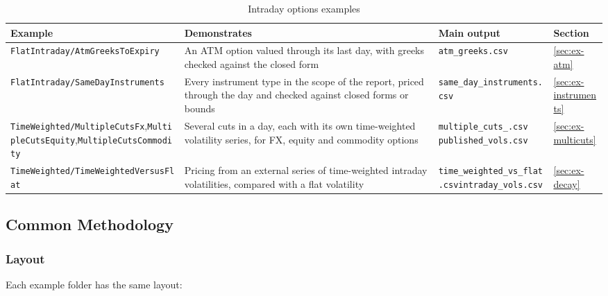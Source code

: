\documentclass[12pt, a4paper]{article}
\begin{document}
\begin{table}[H]
\centering
\small
\begin{tabular}{|>{\raggedright\arraybackslash}p{4.3cm}|>{\raggedright\arraybackslash}p{4.3cm}|>{\raggedright\arraybackslash}p{3.6cm}|l|}
\hline
Example & Demonstrates & Main output & Section \\
\hline
\texttt{FlatIntraday/\allowbreak AtmGreeksToExpiry} & An ATM option valued through its last day, with greeks checked against the
closed form & \texttt{atm\_greeks.csv} & \ref{sec:ex-atm} \\
\hline
\texttt{FlatIntraday/\allowbreak SameDayInstruments} & Every instrument type in the scope of the report, priced
through the day and checked against closed forms or bounds & \texttt{same\_day\_\allowbreak instruments.csv} & \ref{sec:ex-instruments} \\
\hline
\texttt{TimeWeighted/}\newline\texttt{MultipleCutsFx},\newline\texttt{MultipleCutsEquity},\newline\texttt{MultipleCutsCommodity} & Several cuts in a day, each with its own time-weighted
volatility series, for FX, equity and commodity options & \texttt{multiple\_cuts\_\allowbreak *.csv}\newline
\texttt{published\_vols.csv} & \ref{sec:ex-multicuts} \\
\hline
\texttt{TimeWeighted/}\newline\texttt{TimeWeighted\allowbreak VersusFlat} & Pricing from an external series of time-weighted intraday volatilities, compared with a
flat volatility & \texttt{time\_weighted\_\allowbreak vs\_flat.csv}\newline \texttt{intraday\_vols.csv} & \ref{sec:ex-decay} \\
\hline
\end{tabular}
\caption{Intraday options examples}
\label{tab:inventory}
\end{table}

\subsection{Common Methodology}\label{sec:ex-method}

\subsubsection*{Layout}

Each example folder has the same layout:
\end{document}
